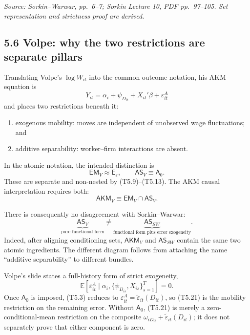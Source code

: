 \documentclass[11pt]{article}
\begin{document}
\textit{Source: Sorkin--Warwar, pp.\ 6--7; Sorkin Lecture 10, PDF
pp.\ 97--105.  Set representation and strictness proof are derived.}

\subsection{5.6 Volpe: why the two restrictions are separate pillars}

Translating Volpe's \(\log W_{it}\) into the common outcome notation, his AKM
equation is
\[
Y_{it}
=
\alpha_i+\psi_{D_{it}}+X_{it}'\beta+\varepsilon^A_{it}
\tag{T5.17}
\]
and places two restrictions beneath it:

\begin{enumerate}
\item exogenous mobility: moves are independent of unobserved wage
  fluctuations; and
\item additive separability: worker--firm interactions are absent.
\end{enumerate}

In the atomic notation, the intended distinction is
\[
\mathsf{EM}_{V}\approx\mathsf E_\varepsilon,
\qquad
\mathsf{AS}_{V}\equiv\mathsf A_0.
\tag{T5.18}
\]
These are separate and non-nested by (T5.9)--(T5.13).  The AKM causal
interpretation requires both:
\[
\mathsf{AKM}_{V}
\equiv
\mathsf{EM}_{V}\cap\mathsf{AS}_{V}.
\tag{T5.19}
\]

There is consequently no disagreement with Sorkin--Warwar:
\[
\underbrace{\mathsf{AS}_{V}}_{\text{pure functional form}}
\neq
\underbrace{\mathsf{AS}_{SW}}_{\text{functional form plus error exogeneity}}.
\tag{T5.20}
\]
Indeed, after aligning conditioning sets,
\(\mathsf{AKM}_{V}\) and \(\mathsf{AS}_{SW}\) contain the same two atomic
ingredients.  The different diagram follows from attaching the name
``additive separability'' to different bundles.

Volpe's slide states a full-history form of strict exogeneity,
\[
\mathbb E[
\varepsilon^A_{it}
\mid
\alpha_i,\{\psi_{D_{is}},X_{is}\}_{s=1}^T
]
=0.
\tag{T5.21}
\]
Once \(\mathsf A_0\) is imposed, (T5.3) reduces to
\(\varepsilon^A_{it}=\widetilde\varepsilon_{it}(D_{it})\), so (T5.21) is the
mobility restriction on the remaining error.  Without \(\mathsf A_0\),
(T5.21) is merely a zero-conditional-mean restriction on the composite
\(\omega_{iD_{it}}+\widetilde\varepsilon_{it}(D_{it})\); it does not
separately prove that either component is zero.
\end{document}

